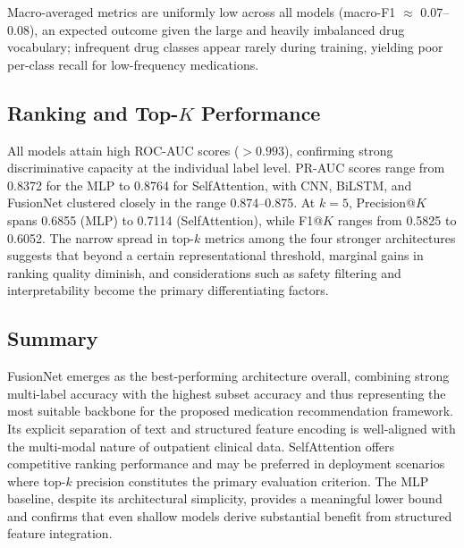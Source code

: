 Macro-averaged metrics are uniformly low across all models (macro-F1 $\approx$ 0.07--0.08), an expected outcome given the large and heavily imbalanced drug vocabulary; infrequent drug classes appear rarely during training, yielding poor per-class recall for low-frequency medications.

\subsection{Ranking and Top-$K$ Performance}
All models attain high ROC-AUC scores (${>}0.993$), confirming strong discriminative capacity at the individual label level. PR-AUC scores range from 0.8372 for the MLP to 0.8764 for SelfAttention, with CNN, BiLSTM, and FusionNet clustered closely in the range 0.874--0.875. At $k = 5$, Precision@$K$ spans 0.6855 (MLP) to 0.7114 (SelfAttention), while F1@$K$ ranges from 0.5825 to 0.6052. The narrow spread in top-$k$ metrics among the four stronger architectures suggests that beyond a certain representational threshold, marginal gains in ranking quality diminish, and considerations such as safety filtering and interpretability become the primary differentiating factors.

\subsection{Summary}
FusionNet emerges as the best-performing architecture overall, combining strong multi-label accuracy with the highest subset accuracy and thus representing the most suitable backbone for the proposed medication recommendation framework. Its explicit separation of text and structured feature encoding is well-aligned with the multi-modal nature of outpatient clinical data. SelfAttention offers competitive ranking performance and may be preferred in deployment scenarios where top-$k$ precision constitutes the primary evaluation criterion. The MLP baseline, despite its architectural simplicity, provides a meaningful lower bound and confirms that even shallow models derive substantial benefit from structured feature integration.
